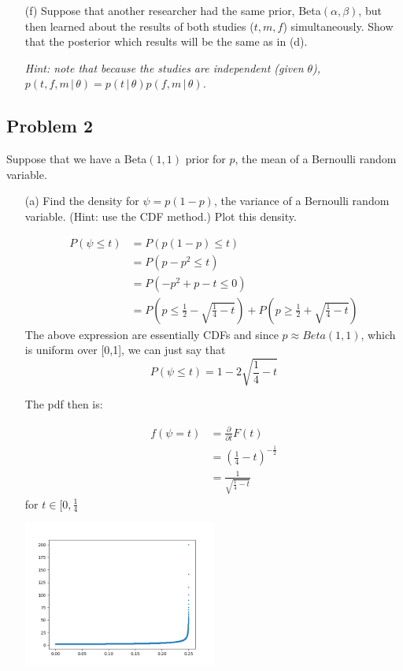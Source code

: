 \documentclass{article}
\newcommand{\1}{\mathbf{1}}
\begin{document}
\begin{enumerate}
    \item[(f)] Suppose that another researcher had the same prior, Beta$(\alpha, \beta)$, but then learned about the results of both studies  ($t,m,f$) simultaneously. Show that the posterior which results will be the same as in (d).\par
    {\it Hint: note that because the studies are independent (given $\theta$), $p(t,f,m\,|\,\theta) = p(t\,|\,\theta)p(f,m\,|\,\theta)$.}
\end{enumerate}


\newpage
\subsection*{Problem 2} 
Suppose that we have a Beta$(1,1)$ prior for $p$, the mean of a Bernoulli random variable.
\begin{enumerate}
        \item[(a)] Find the density for $\psi = p(1-p)$, the variance of a Bernoulli random variable. (Hint: use the CDF method.) Plot this density.
    
    \begin{align*}
        P(\psi \leq t) &= P(p(1-p) \leq t) \\
        &= P(p-p^2 \leq t) \\
        &= P(-p^2 + p -t \leq 0) \\
        &= P\left( p \leq \frac{1}{2} - \sqrt{\frac{1}{4} - t}\right) + P\left( p \geq \frac{1}{2} + \sqrt{\frac{1}{4} - t}\right)
    \end{align*}
    The above expression are essentially CDFs and since $p\approx Beta(1,1)$, which is uniform over [0,1], we can just say that
    $$P(\psi \leq t) = 1- 2\sqrt{\frac{1}{4} - t}$$
    
    The pdf then is:
    
    \begin{align*}
        f(\psi = t) &= \frac{\partial}{\partial t} F(t) \\
        &= \left(\frac{1}{4} - t\right)^{-\frac{1}{2}} \\
        &= \frac{1}{\sqrt{\frac{1}{4} - t}}
    \end{align*}
    for $t\in [0, \frac{1}{4}$
    
    \begin{center}
        \includegraphics[width=0.5\textwidth]{STATS509/HW6/HW6Figures/problem2a.png}
    \end{center}
    

\end{enumerate}
\end{document}
